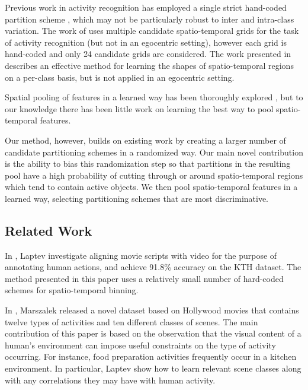 \documentclass[10pt,twocolumn,letterpaper]{article}
\begin{document}

  Previous work in activity recognition has employed a single strict
  hand-coded partition scheme \cite{Ramanan12}, which may not be particularly robust to
  inter and intra-class variation. The work of \cite{Laptev08} uses multiple
  candidate spatio-temporal grids for the task of activity recognition (but
  not in an egocentric setting), however each grid is hand-coded and only 24
  candidate grids are considered. The work presented in \cite{Kovashka10}
  describes an effective method for learning the shapes of spatio-temporal
  regions on a per-class basis, but is not applied in an egocentric setting.

  Spatial pooling of features in a learned way has been thoroughly
  explored \cite{Sharma11}, but to our knowledge there has been little work
  on learning the best way to pool spatio-temporal features.
  
  Our method, however, builds on existing work by creating a larger number
  of candidate partitioning schemes in a randomized way. Our main novel contribution is
  the ability to bias this randomization step so that partitions in the
  resulting pool have a high probability of cutting through or around
  spatio-temporal regions which tend to contain active objects.
  We then pool spatio-temporal features in a
  learned way, selecting partitioning schemes that are most discriminative.

\subsection{Related Work}


	In \cite{Laptev08}, Laptev \etal investigate aligning movie scripts with
	video for the purpose of annotating human actions, and achieve 91.8\%
	accuracy on the KTH dataset. The method presented in this paper uses a
  relatively small number of hard-coded schemes for spatio-temporal binning.
	
	In \cite{Marszalek09}, Marszalek \etal released a novel dataset based on
	Hollywood movies that contains twelve types of activities and ten
	different classes of scenes. The main contribution of this paper is based
	on the observation that the visual content of a human's environment can
	impose useful constraints on the type of activity occurring. For instance,
	food preparation activities frequently occur in a kitchen environment. In
	particular, Laptev \etal show how to learn relevant scene classes along
	with any correlations they may have with human activity.
	
\end{document}
